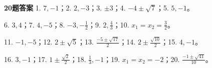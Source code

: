 \documentclass{exam-zh}
\begin{document}
\begin{keyideabox}
  \textbf{20题答案}
  1. $7,-1$；2. $2,-3$；3. $\pm3$；4. $-4\pm\sqrt7$；5. $5,-1$。

6. $3,4$；7. $4,-5$；8. $-3,-\frac12$；9. $2,\frac43$；10. $x_1=x_2=\frac32$。

11. $-1,-5$；12. $2\pm\sqrt5$；13. $\frac{-5\pm\sqrt{17}}2$；14. $2\pm\frac{\sqrt{10}}2$；15. $4,-1$。

16. $3,-1$；17. $1\pm\frac{\sqrt2}{2}$；18. $\frac13,-1$；19. $x_1=x_2=-2$；20. $\frac{-1\pm\sqrt{41}}{10}$。

\end{keyideabox}
\end{document}
